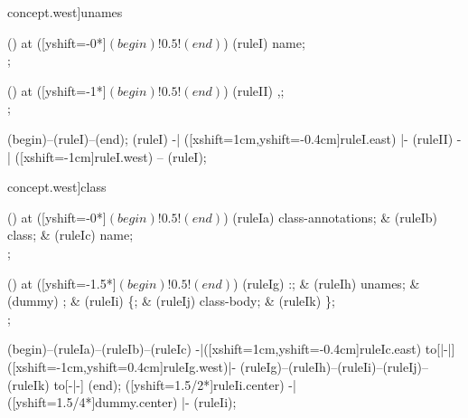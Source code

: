 \begin{syntax}[[xshift=20mm]concept.west]{unames}
  
  \node[sequence] () at ([yshift=-0*\syntaxruledist]$(begin)!0.5!(end)$) {
    \node[nonterminal] (ruleI) {name};
    \\
  };
  
  \node[sequence] () at ([yshift=-1*\syntaxruledist]$(begin)!0.5!(end)$) {
    \node[terminal]    (ruleII) {,};
    \\
  };
  
  \draw[path] (begin)--(ruleI)--(end);
  \draw[path] (ruleI) -| ([xshift=1cm,yshift=-0.4cm]ruleI.east) |- (ruleII) -| ([xshift=-1cm]ruleI.west) -- (ruleI);
\end{syntax}

\begin{syntax}[[xshift=20mm]concept.west]{class}
  
  \node[sequence] () at ([yshift=-0*\syntaxruledist]$(begin)!0.5!(end)$) {
    \node[nonterminal] (ruleIa) {class-annotations};
    &
    \node[terminal]    (ruleIb) {class};
    &
    \node[nonterminal] (ruleIc) {name};
    \\
  };
  
  \node[sequence] () at ([yshift=-1.5*\syntaxruledist]$(begin)!0.5!(end)$) {
    \node[nonterminal] (ruleIg) {:};
    &
    \node[nonterminal] (ruleIh) {unames};
    &
    \node[] (dummy) {};
    &
    \node[terminal] (ruleIi) {\{};
    &
    \node[nonterminal] (ruleIj) {class-body};
    &
    \node[terminal] (ruleIk) {\}};
    \\
  };
  
  \draw[path] (begin)--(ruleIa)--(ruleIb)--(ruleIc)
    -|([xshift=1cm,yshift=-0.4cm]ruleIc.east) to[|-|] ([xshift=-1cm,yshift=0.4cm]ruleIg.west)|-
    (ruleIg)--(ruleIh)--(ruleIi)--(ruleIj)--(ruleIk) to[-|-] (end);
  \draw[path] ([yshift=1.5/2*\syntaxruledist]ruleIi.center) -| ([yshift=1.5/4*\syntaxruledist]dummy.center) |- (ruleIi);
\end{syntax}

